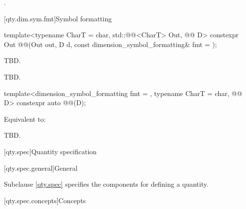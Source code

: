 \begin{itemdescr}
\pnum
\returns
{}.
\end{itemdescr}

[qty.dim.sym.fmt]{Symbol formatting}

\begin{itemdecl}
template<typename CharT = char, std::@@<CharT> Out, @@ D>
constexpr Out @@(Out out, D d, const dimension_symbol_formatting& fmt = {});
\end{itemdecl}

\begin{itemdescr}
\pnum
\effects
TBD.

\pnum
\returns
TBD.
\end{itemdescr}

\begin{itemdecl}
template<dimension_symbol_formatting fmt = {}, typename CharT = char, @@ D>
constexpr auto @@(D);
\end{itemdecl}

\begin{itemdescr}
\pnum
\effects
Equivalent to:
\begin{codeblock}
TBD.
\end{codeblock}
\end{itemdescr}

[qty.spec]{Quantity specification}

[qty.spec.general]{General}

\pnum
Subclause \ref{qty.spec} specifies the components
for defining a quantity.

[qty.spec.concepts]{Concepts}

